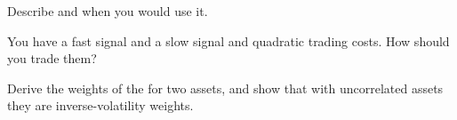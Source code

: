 \begin{interviewq}\label{iq:rs:portfolio-construction-ii:4}
Describe  and when you would use it.
\end{interviewq}

\begin{interviewq}\label{iq:rs:portfolio-construction-ii:5}
You have a fast signal and a slow signal and quadratic trading costs. How should you trade them?
\end{interviewq}

\begin{interviewq}\label{iq:rs:portfolio-construction-ii:6}
Derive the weights of the  for two assets, and show that with uncorrelated assets they are inverse-volatility weights.
\end{interviewq}

